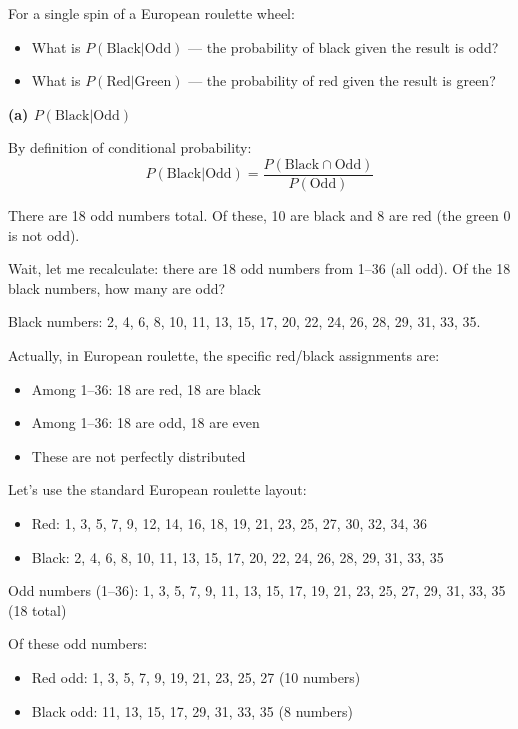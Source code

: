 \documentclass[11pt,a4paper]{article}
\begin{document}
\begin{question}
For a single spin of a European roulette wheel:
\begin{itemize}
    \item[(a)] What is $P(\text{Black}|\text{Odd})$ — the probability of black given the result is odd?
    \item[(b)] What is $P(\text{Red}|\text{Green})$ — the probability of red given the result is green?
\end{itemize}
\end{question}

\begin{answer}
\textbf{(a) $P(\text{Black}|\text{Odd})$}

By definition of conditional probability:
\[
P(\text{Black}|\text{Odd}) = \frac{P(\text{Black} \cap \text{Odd})}{P(\text{Odd})}
\]

There are 18 odd numbers total. Of these, 10 are black and 8 are red (the green 0 is not odd).

Wait, let me recalculate: there are 18 odd numbers from 1--36 (all odd). Of the 18 black numbers, how many are odd?

Black numbers: 2, 4, 6, 8, 10, 11, 13, 15, 17, 20, 22, 24, 26, 28, 29, 31, 33, 35.

Actually, in European roulette, the specific red/black assignments are:
\begin{itemize}
    \item Among 1--36: 18 are red, 18 are black
    \item Among 1--36: 18 are odd, 18 are even
    \item These are not perfectly distributed
\end{itemize}

Let's use the standard European roulette layout:
\begin{itemize}
    \item Red: 1, 3, 5, 7, 9, 12, 14, 16, 18, 19, 21, 23, 25, 27, 30, 32, 34, 36
    \item Black: 2, 4, 6, 8, 10, 11, 13, 15, 17, 20, 22, 24, 26, 28, 29, 31, 33, 35
\end{itemize}

Odd numbers (1--36): 1, 3, 5, 7, 9, 11, 13, 15, 17, 19, 21, 23, 25, 27, 29, 31, 33, 35 (18 total)

Of these odd numbers:
\begin{itemize}
    \item Red odd: 1, 3, 5, 7, 9, 19, 21, 23, 25, 27 (10 numbers)
    \item Black odd: 11, 13, 15, 17, 29, 31, 33, 35 (8 numbers)
\end{itemize}


\end{answer}
\end{document}
